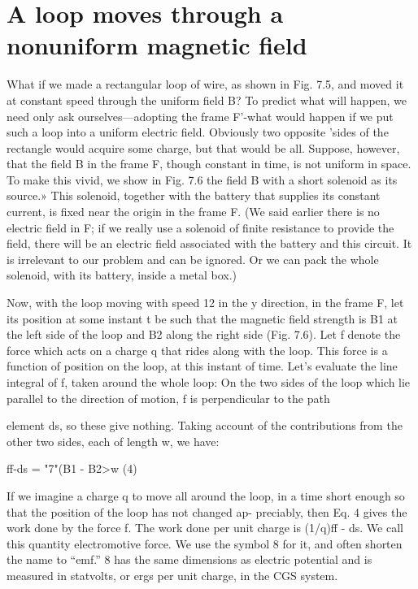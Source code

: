\section{A loop moves through a nonuniform magnetic field}

What if we made a rectangular loop of wire, as shown in Fig. 7.5,
and moved it at constant speed through the uniform field B? To
predict what will happen, we need only ask ourselves---adopting the
frame F'-what would happen if we put such a loop into a uniform
electric field. Obviously two opposite 'sides of the rectangle would
acquire some charge, but that would be all. Suppose, however, that
the field B in the frame F, though constant in time, is not uniform in
space. To make this vivid, we show in Fig. 7.6 the field B with a short
solenoid as its source.» This solenoid, together with the battery that
supplies its constant current, is fixed near the origin in the frame F.
(We said earlier there is no electric field in F; if we really use a
solenoid of finite resistance to provide the field, there will be an electric
field associated with the battery and this circuit. It is irrelevant
to our problem and can be ignored. Or we can pack the whole
solenoid, with its battery, inside a metal box.)

Now, with the loop moving with speed 12 in the y direction, in the
frame F, let its position at some instant t be such that the magnetic
field strength is B1 at the left side of the loop and B2 along the right
side (Fig. 7.6). Let f denote the force which acts on a charge q that
rides along with the loop. This force is a function of position on the
loop, at this instant of time. Let's evaluate the line integral of f,
taken around the whole loop: On the two sides of the loop which lie
parallel to the direction of motion, f is perpendicular to the path

 

element ds, so these give nothing. Taking account of the contributions
from the other two sides, each of length w, we have:

ff-ds = "7"(B1 - B2>w (4)

If we imagine a charge q to move all around the loop, in a time
short enough so that the position of the loop has not changed ap-
preciably, then Eq. 4 gives the work done by the force f. The work
done per unit charge is (1/q)ff - ds. We call this quantity electromotive
force. We use the symbol 8 for it, and often shorten the name
to ``emf.'' 8 has the same dimensions as electric potential and is
measured in statvolts, or ergs per unit charge, in the CGS system.

